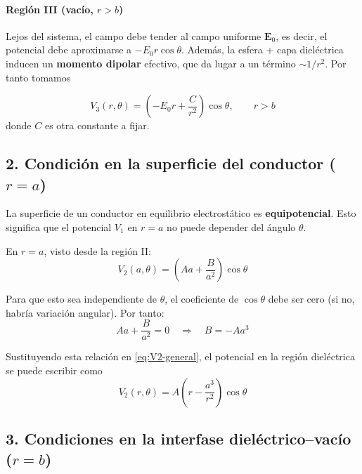 \documentclass{article}
\begin{document}
\paragraph{Región III (vacío, $r>b$)}

Lejos del sistema, el campo debe tender al campo uniforme $\mathbf{E}_{0}$, es decir, el potencial debe aproximarse a $-E_{0}r\cos\theta$.  
Además, la esfera + capa dieléctrica inducen un \textbf{momento dipolar} efectivo, que da lugar a un término $\sim 1/r^{2}$. Por tanto tomamos

\begin{equation}
V_{3}(r,\theta) = \left(-E_{0} r + \frac{C}{r^{2}}\right)\cos\theta,
\qquad r>b
\label{eq:V3-general}
\end{equation}
donde $C$ es otra constante a fijar.

\subsection*{2. Condición en la superficie del conductor ($r=a$)}

La superficie de un conductor en equilibrio electrostático es \textbf{equipotencial}.  
Esto significa que el potencial $V_{1}$ en $r=a$ no puede depender del ángulo $\theta$.

En $r=a$, visto desde la región II:
\begin{equation}
V_{2}(a,\theta) = \left(A a + \frac{B}{a^{2}}\right)\cos\theta
\label{eq:V2-en-a}
\end{equation}

Para que esto sea independiente de $\theta$, el coeficiente de $\cos\theta$ debe ser cero (si no, habría variación angular).  
Por tanto:
\begin{equation}
A a + \frac{B}{a^{2}} = 0
\quad\Longrightarrow\quad
B = -A a^{3}
\label{eq:rel-AB}
\end{equation}

Sustituyendo esta relación en \eqref{eq:V2-general}, el potencial en la región dieléctrica se puede escribir como
\begin{equation}
V_{2}(r,\theta) = A\left(r - \frac{a^{3}}{r^{2}}\right)\cos\theta
\label{eq:V2-simplificada}
\end{equation}

\subsection*{3. Condiciones en la interfase dieléctrico–vacío ($r=b$)}
\end{document}
